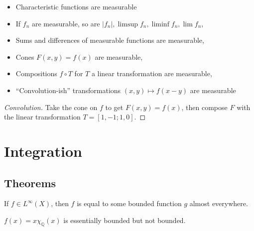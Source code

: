 \begin{proposition}

\begin{itemize}
\tightlist
\item
  Characteristic functions are measurable
\item
  If \(f_{n}\) are measurable, so are
  \({\left\lvert {f_{n}} \right\rvert}, \limsup f_{n}, \liminf f_{n}, \lim f_{n}\),
\item
  Sums and differences of measurable functions are measurable,
\item
  Cones \(F(x,y) = f(x)\) are measurable,
\item
  Compositions \(f\circ T\) for \(T\) a linear transformation are
  measurable,
\item
  ``Convolution-ish'' transformations \((x,y) \mapsto f(x-y)\) are
  measurable
\end{itemize}

\end{proposition}

\begin{proof}[Convolution]

Take the cone on \(f\) to get \(F(x, y) = f(x)\), then compose \(F\)
with the linear transformation \(T = [1, -1; 1, 0]\).

\end{proof}

\hypertarget{integration}{%
\section{Integration}\label{integration}}

\hypertarget{theorems-2}{%
\subsection{Theorems}\label{theorems-2}}

\begin{remark}

If \(f\in L^\infty(X)\), then \(f\) is equal to some bounded function
\(g\) almost everywhere.

\end{remark}

\begin{example}[?]

\(f(x) = x\chi_{\mathbb{Q}}(x)\) is essentially bounded but not bounded.

\end{example}

